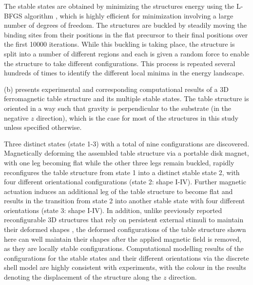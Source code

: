 The stable states are obtained by minimizing the structures energy using the L-BFGS algorithm \cite{Nocedal1980,Liu1989}, which is highly efficient for minimization involving a large number of degrees of freedom.
The structures are buckled by steadily moving the binding sites from their positions in the flat precursor to their final positions over the first \num{10000} iterations.
While this buckling is taking place, the structure is split into a number of different regions and each is given a random force to enable the structure to take different configurations.
This process is repeated several hundreds of times to identify the different local minima in the energy landscape.

(b) presents experimental and corresponding computational results of a 3D ferromagnetic table structure and its multiple stable states.
The table structure is oriented in a way such that gravity is perpendicular to the substrate (in the negative $z$ direction), which is the case for most of the structures in this study unless specified otherwise.

Three distinct states (state 1-3) with a total of nine configurations are discovered.
Magnetically deforming the assembled table structure via a portable disk magnet, with one leg becoming flat while the other three legs remain buckled, rapidly reconfigures the table structure from state 1 into a distinct stable state 2, with four different orientational configurations (state 2: shape I-IV).
Further magnetic actuation induces an additional leg of the table structure to become flat and results in the transition from state 2 into another stable state with four different orientations (state 3: shape I-IV).
In addition, unlike previously reported reconfigurable 3D structures that rely on persistent external stimuli to maintain their deformed shapes \cite{Kim2018,Gladman2016,White2015,Hajiesmaili2019}, the deformed configurations of the table structure shown here can well maintain their shapes after the applied magnetic field is removed, as they are locally stable configurations.
Computational modelling results of the configurations for the stable states and their different orientations via the discrete shell model are highly consistent with experiments, with the colour in the results denoting the displacement of the structure along the $z$ direction.

